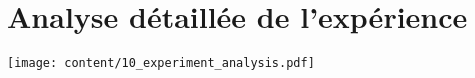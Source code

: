 \chapter{Analyse détaillée de l'expérience}
\label{appendix:experiment_analysis}

\texttt{[image: content/10\_experiment\_analysis.pdf]}
